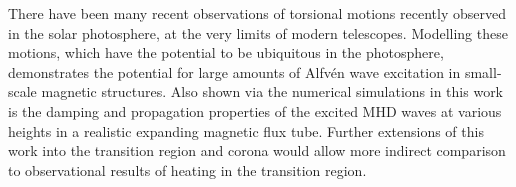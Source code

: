There have been many recent observations of torsional motions recently observed in the solar photosphere, at the very limits of modern telescopes.
 Modelling these motions, which have the potential to be ubiquitous in the photosphere, demonstrates the potential for large amounts of Alfv\'e{n} wave excitation in small-scale magnetic structures.
 Also shown via the numerical simulations in this work is the damping and propagation properties of the excited MHD waves at various heights in a realistic expanding magnetic flux tube.
 Further extensions of this work into the transition region and corona would allow more indirect comparison to observational results of heating in the transition region.

